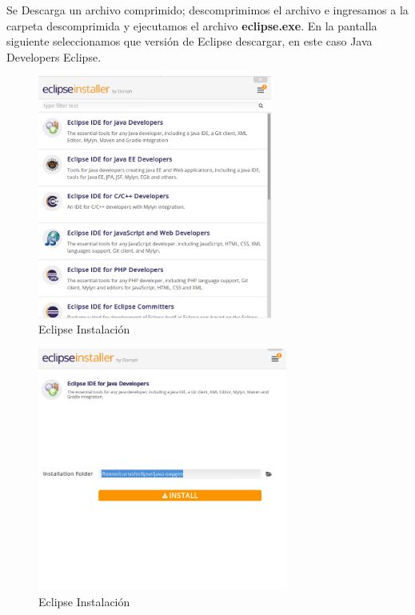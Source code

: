 Se Descarga un archivo comprimido; descomprimimos el archivo e ingresamos a la carpeta descomprimida y ejecutamos el archivo 
\textbf{eclipse.exe}. En la pantalla siguiente seleccionamos que versión de Eclipse descargar, en este caso Java Developers Eclipse.

\begin{figure}[h]
 \centering
  \includegraphics[height=8cm,keepaspectratio=true,clip=true]{imagenes/Apendice/eclipse2.png}
  \caption{Eclipse Instalación}
\end{figure}

\begin{figure}[h]
 \centering
  \includegraphics[height=8cm,keepaspectratio=true,clip=true]{imagenes/Apendice/eclipse3.png}
  \caption{Eclipse Instalación}
\end{figure}

